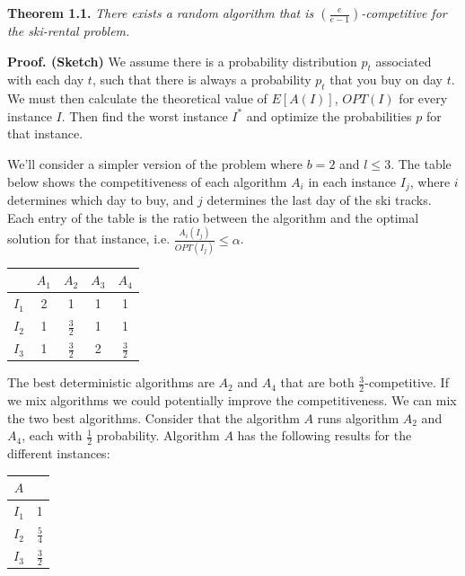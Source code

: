 \documentclass[14pt]{extreport}
\begin{document}
\textbf{Theorem 1.1.} \textit{There exists a random algorithm that is $\left(\frac{e}{e-1}\right)$-competitive for the ski-rental problem.}

    \vspace{5mm}
    \textbf{Proof. (Sketch)} We assume there is a probability distribution $p_t$ associated with each day $t$, such that there is always a probability $p_t$ that you buy on day $t$. We must then calculate the theoretical value of $E[A(I)]$, $OPT(I)$ for every instance $I$. Then find the worst instance $I^*$ and optimize the probabilities $p$ for that instance.

    \vspace{5mm}
    We'll consider a simpler version of the problem where $b = 2$ and $l \leq 3$. The table below shows the competitiveness of each algorithm $A_i$ in each instance $I_j$, where $i$ determines which day to buy, and $j$ determines the last day of the ski tracks. Each entry of the table is the ratio between the algorithm and the optimal solution for that instance, i.e. $\frac{A_i(I_j)}{OPT(I_j)} \leq \alpha$.
    
    \begin{center}
    \begin{tabular}{c|cccc}
     & $A_1$ & $A_2$ & $A_3$ & $A_4$ \\
    \hline
    $I_1$ & 2 & 1 & 1 & 1 \\
    $I_2$ & 1 & $\frac{3}{2}$ & 1 & 1 \\
    $I_3$ & 1 & $\frac{3}{2}$ & 2 & $\frac{3}{2}$ \\
    \end{tabular}
    \end{center}
    
    The best deterministic algorithms are $A_2$ and $A_4$ that are both $\frac{3}{2}$-competitive. If we mix algorithms we could potentially improve the competitiveness. We can mix the two best algorithms. Consider that the algorithm $A$ runs algorithm $A_2$ and $A_4$, each with $\frac{1}{2}$ probability. Algorithm $A$ has the following results for the different instances:
    
    \begin{center}
    \begin{tabular}{c|c}
    $A$ &  \\
    \hline
    $I_1$ & 1 \\
    $I_2$ & $\frac{5}{4}$ \\
    $I_3$ & $\frac{3}{2}$ \\
    \end{tabular}
    \end{center}
    
\end{document}
